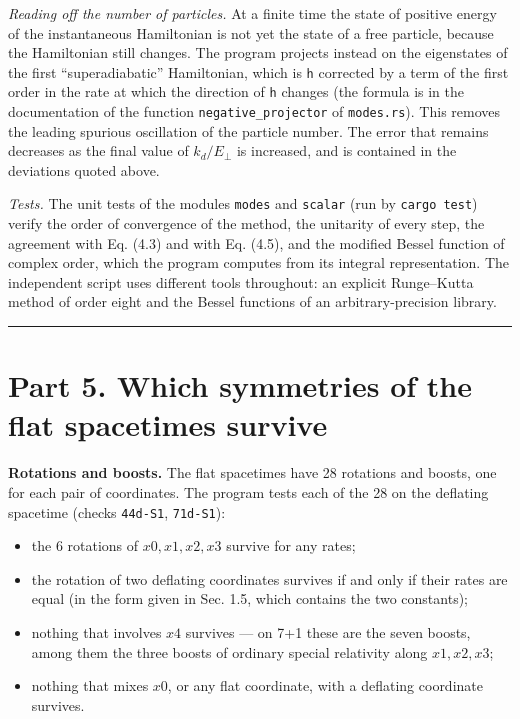 \documentclass[
  10pt,
]{article}
\providecommand{\tightlist}{%
  \setlength{\itemsep}{0pt}\setlength{\parskip}{0pt}}
\begin{document}
\emph{Reading off the number of particles.} At a finite time the state
of positive energy of the instantaneous Hamiltonian is not yet the state
of a free particle, because the Hamiltonian still changes. The program
projects instead on the eigenstates of the first ``superadiabatic''
Hamiltonian, which is \(\mathsf h\) corrected by a term of the first
order in the rate at which the direction of \(\mathsf h\) changes (the
formula is in the documentation of the function
\texttt{negative\_projector} of \texttt{modes.rs}). This removes the
leading spurious oscillation of the particle number. The error that
remains decreases as the final value of \(k_d/E_\perp\) is increased,
and is contained in the deviations quoted above.

\emph{Tests.} The unit tests of the modules \texttt{modes} and
\texttt{scalar} (run by \texttt{cargo\ test}) verify the order of
convergence of the method, the unitarity of every step, the agreement
with Eq. (4.3) and with Eq. (4.5), and the modified Bessel function of
complex order, which the program computes from its integral
representation. The independent script uses different tools throughout:
an explicit Runge--Kutta method of order eight and the Bessel functions
of an arbitrary-precision library.

\begin{center}\rule{0.5\linewidth}{0.5pt}\end{center}

\hypertarget{part-5.-which-symmetries-of-the-flat-spacetimes-survive}{%
\section{Part 5. Which symmetries of the flat spacetimes
survive}\label{part-5.-which-symmetries-of-the-flat-spacetimes-survive}}

\textbf{Rotations and boosts.} The flat spacetimes have 28 rotations and
boosts, one for each pair of coordinates. The program tests each of the
28 on the deflating spacetime (checks \texttt{44d-S1}, \texttt{71d-S1}):

\begin{itemize}
\tightlist
\item
  the 6 rotations of \(x0,x1,x2,x3\) survive for any rates;
\item
  the rotation of two deflating coordinates survives if and only if
  their rates are equal (in the form given in Sec. 1.5, which contains
  the two constants);
\item
  nothing that involves \(x4\) survives --- on 7+1 these are the seven
  boosts, among them the three boosts of ordinary special relativity
  along \(x1,x2,x3\);
\item
  nothing that mixes \(x0\), or any flat coordinate, with a deflating
  coordinate survives.
\end{itemize}
\end{document}
